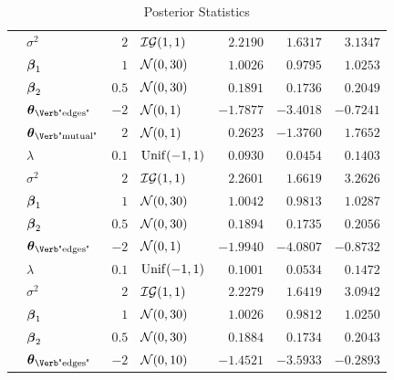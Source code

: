 \begin{table}[t]
\begin{tabular}{cl|rlrrr}
        & $\sigma^2$                       & $2$   & $\mathcal{IG}(1,1)$   & $2.2190$  & $1.6317$  & $3.1347$  \\
        & $\boldsymbol{\beta}_{1}$                     & $1$   & $\mathcal{N}(0,30)$        & $1.0026$  & $0.9795$  & $1.0253$  \\
        & $\boldsymbol{\beta}_{2}$                     & $0.5$ & $\mathcal{N}(0,30)$        & $0.1891$  & $0.1736$  & $0.2049$  \\
        & $\ttheta_{\text{\Verb"edges"}}$  & $-2$  & $\mathcal{N}(0,1)$  & $-1.7877$ & $-3.4018$ & $-0.7241$ \\
        & $\ttheta_{\text{\Verb"mutual"}}$ & $2$   & $\mathcal{N}(0,1)$  & $0.2623$  & $-1.3760$ & $1.7652$  \\
		\midrule
        & $\lambda$                        & $0.1$ & $\mathrm{Unif}(-1,1)$       & $0.0930$  & $0.0454$  & $0.1403$  \\
        & $\sigma^2$                       & $2$   & $\mathcal{IG}(1,1)$   & $2.2601$  & $1.6619$  & $3.2626$  \\
        & $\boldsymbol{\beta}_{1}$                     & $1$   & $\mathcal{N}(0,30)$        & $1.0042$  & $0.9813$  & $1.0287$  \\
        & $\boldsymbol{\beta}_{2}$                     & $0.5$ & $\mathcal{N}(0,30)$        & $0.1894$  & $0.1735$  & $0.2056$  \\
        & $\ttheta_{\text{\Verb"edges"}}$  & $-2$  & $\mathcal{N}(0,1)$  & $-1.9940$ & $-4.0807$ & $-0.8732$ \\
		\midrule
        & $\lambda$                        & $0.1$ & $\mathrm{Unif}(-1,1)$       & $0.1001$  & $0.0534$  & $0.1472$  \\
        & $\sigma^2$                       & $2$   & $\mathcal{IG}(1,1)$   & $2.2279$  & $1.6419$  & $3.0942$  \\
        & $\boldsymbol{\beta}_{1}$                     & $1$   & $\mathcal{N}(0,30)$        & $1.0026$  & $0.9812$  & $1.0250$  \\
        & $\boldsymbol{\beta}_{2}$                     & $0.5$ & $\mathcal{N}(0,30)$        & $0.1884$  & $0.1734$  & $0.2043$  \\
        & $\ttheta_{\text{\Verb"edges"}}$  & $-2$  & $\mathcal{N}(0,10)$ & $-1.4521$ & $-3.5933$ & $-0.2893$ \\
		\bottomrule
	\end{tabular}
	\caption{Posterior Statistics}
	\label{tab:P1}
\end{table}
